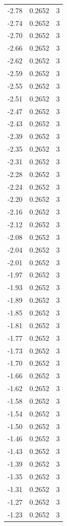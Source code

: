 \begin{longtable}{lrr}
  -2.78 & 0.2652 & 3 \\
  -2.74 & 0.2652 & 3 \\
  -2.70 & 0.2652 & 3 \\
  -2.66 & 0.2652 & 3 \\
  -2.62 & 0.2652 & 3 \\
  -2.59 & 0.2652 & 3 \\
  -2.55 & 0.2652 & 3 \\
  -2.51 & 0.2652 & 3 \\
  -2.47 & 0.2652 & 3 \\
  -2.43 & 0.2652 & 3 \\
  -2.39 & 0.2652 & 3 \\
  -2.35 & 0.2652 & 3 \\
  -2.31 & 0.2652 & 3 \\
  -2.28 & 0.2652 & 3 \\
  -2.24 & 0.2652 & 3 \\
  -2.20 & 0.2652 & 3 \\
  -2.16 & 0.2652 & 3 \\
  -2.12 & 0.2652 & 3 \\
  -2.08 & 0.2652 & 3 \\
  -2.04 & 0.2652 & 3 \\
  -2.01 & 0.2652 & 3 \\
  -1.97 & 0.2652 & 3 \\
  -1.93 & 0.2652 & 3 \\
  -1.89 & 0.2652 & 3 \\
  -1.85 & 0.2652 & 3 \\
  -1.81 & 0.2652 & 3 \\
  -1.77 & 0.2652 & 3 \\
  -1.73 & 0.2652 & 3 \\
  -1.70 & 0.2652 & 3 \\
  -1.66 & 0.2652 & 3 \\
  -1.62 & 0.2652 & 3 \\
  -1.58 & 0.2652 & 3 \\
  -1.54 & 0.2652 & 3 \\
  -1.50 & 0.2652 & 3 \\
  -1.46 & 0.2652 & 3 \\
  -1.43 & 0.2652 & 3 \\
  -1.39 & 0.2652 & 3 \\
  -1.35 & 0.2652 & 3 \\
  -1.31 & 0.2652 & 3 \\
  -1.27 & 0.2652 & 3 \\
  -1.23 & 0.2652 & 3 \\

\end{longtable}
